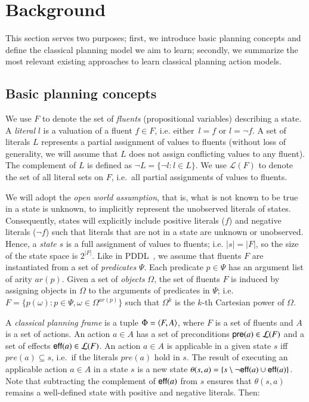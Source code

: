 
\section{Background}
\label{sec:background}

This section serves two purposes; first, we introduce basic planning concepts and define the classical planning model we aim to learn; secondly, we summarize the most relevant existing approaches to learn classical planning action models.



\subsection{Basic planning concepts}
\label{basic_planning}


We use $F$ to denote the set of {\em fluents} (propositional variables) describing a state. A {\em literal} $l$ is a valuation of a fluent $f\in F$, i.e. either~$l=f$ or $l=\neg f$. A set of literals $L$ represents a partial assignment of values to fluents (without loss of generality, we will assume that $L$ does not assign conflicting values to any fluent). \textcolor[rgb]{1.00,0.00,0.00}{The complement of $L$ is defined as $\neg L=\{\neg l:l\in L\}$.} We use $\mathcal{L}(F)$ to denote the set of all literal sets on $F$, i.e.~all partial assignments of values to fluents.

\textcolor[rgb]{1.00,0.00,0.00}{We will adopt the \emph{open world assumption}, that is, what is not known to be true in a state is unknown, to implicitly represent the unobserved literals of states. Consequently, states will explicitly include positive literals ($f$) and negative literals ($\neg f$) such that literals that are not in a state are unknown or unobserved.} Hence, a {\em state} $s$ is a full assignment of values to fluents; i.e. $|s|=|F|$, so the size of the state space is $2^{|F|}$. Like in PDDL~\cite{fox2003pddl2}, we assume that fluents $F$ are instantiated from a set of {\em predicates} $\Psi$. Each predicate $p\in\Psi$ has an argument list of arity $ar(p)$. Given a set of {\em objects} $\Omega$, the set of fluents $F$ is induced by assigning objects in $\Omega$ to the arguments of predicates in $\Psi$; i.e.~$F=\{p(\omega):p\in\Psi,\omega\in\Omega^{ar(p)}\}$ such that $\Omega^k$ is the $k$-th Cartesian power of $\Omega$.

A {\em classical planning frame} is a tuple $\Phi={\langle F,A \rangle}$, where $F$ is a set of fluents and $A$ is a set of actions. An action $a\in A$ has a set of preconditions $\mathsf{pre}(a)\in\mathcal{L}(F)$ and a set of effects $\mathsf{eff}(a)\in\mathcal{L}(F)$. An action $a\in A$ is applicable in a given state $s$ iff $pre(a)\subseteq s$, i.e.~if the literals $pre(a)$ hold in $s$. \textcolor[rgb]{1.00,0.00,0.00}{The result of executing an applicable action $a\in A$ in a state $s$ is a new state $\theta(s,a)=\{s\setminus \neg\mathsf{eff}(a)\cup\mathsf{eff}(a)\}$. Note that subtracting the complement of $\mathsf{eff}(a)$ from $s$ ensures that $\theta(s,a)$ remains a well-defined state with positive and negative literals. Then:}

